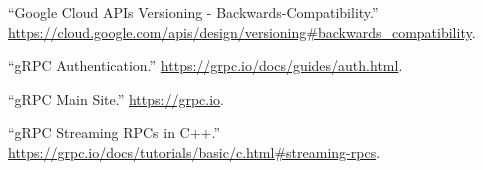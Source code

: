 \documentclass[11pt]{article}
\begin{document}
{{\begin{thebibliography}{39}
\mdbibitemlabel{{}[7]}\textquotedblleft{}Google Cloud APIs Versioning - Backwards-Compatibility.\textquotedblright{} \href{https://cloud.google.com/apis/design/versioning\%23backwards_compatibility}{{\ttfamily https://\hspace{0pt}cloud.\hspace{0pt}google.\hspace{0pt}com/\hspace{0pt}apis/\hspace{0pt}design/\hspace{0pt}versioning\#\hspace{0pt}backwards\_\hspace{0pt}compatibility}}.\label{apiversioningbackwardscompatibility}%

\mdbibitemlabel{{}[8]}\textquotedblleft{}gRPC Authentication.\textquotedblright{} \href{https://grpc.io/docs/guides/auth.html}{{\ttfamily https://\hspace{0pt}grpc.\hspace{0pt}io/\hspace{0pt}docs/\hspace{0pt}guides/\hspace{0pt}auth.\hspace{0pt}html}}.\label{grpcauth}%

\mdbibitemlabel{{}[9]}\textquotedblleft{}gRPC Main Site.\textquotedblright{} \href{https://grpc.io}{{\ttfamily https://\hspace{0pt}grpc.\hspace{0pt}io}}.\label{grpc}%

\mdbibitemlabel{{}[10]}\textquotedblleft{}gRPC Streaming RPCs in C++.\textquotedblright{} \href{https://grpc.io/docs/tutorials/basic/c.html\%23streaming-rpcs}{{\ttfamily https://\hspace{0pt}grpc.\hspace{0pt}io/\hspace{0pt}docs/\hspace{0pt}tutorials/\hspace{0pt}basic/\hspace{0pt}c.\hspace{0pt}html\#\hspace{0pt}streaming-\hspace{0pt}rpcs}}.\label{grpcstreamc}%


\end{thebibliography}}}
\end{document}
